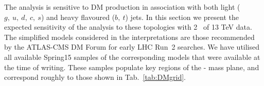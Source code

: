 


The \alphat analysis is sensitive to DM production in association with both
light ($g,~u,~d,~c,~s$) and heavy flavoured ($b,~t$) jets. In this section we
present the expected sensitivity of the analysis to these topologies with 2~\ifb
of 13 TeV data. The simplified models considered in the interpretations are those
recommended by the ATLAS-CMS DM Forum for early LHC Run~2 searches. We have
utilised all available Spring15 samples of the corresponding models that were
available at the time of writing. These samples populate key regions of the
{\mphi-\mchi} mass plane, and correspond roughly to those shown in
Tab.~\ref{tab:DMgrid}.

